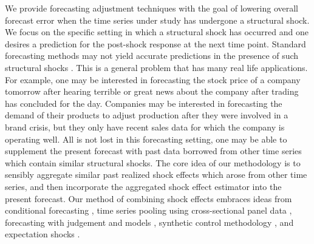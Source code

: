 \documentclass[11pt,3p,review,authoryear]{elsarticle}
\theoremstyle{definition}
\begin{document}
We provide forecasting adjustment techniques with the goal of lowering overall forecast error when the time series under study has undergone a structural shock. We focus on the specific setting in which a structural shock has occurred and one desires a prediction for the post-shock response at the next time point. Standard forecasting methods may not yield accurate predictions in the presence of such structural shocks \citep{baumeister2014real}. This is a general problem that has many real life applications. For example, one may be interested in forecasting the stock price of a company tomorrow after hearing terrible or great news about the company after trading has concluded for the day. Companies may be interested in forecasting the demand of their products to adjust production after they were involved in a brand crisis, but they only have recent sales data for which the company is operating well. All is not lost in this forecasting setting, one may be able to supplement the present forecast with past data borrowed from other time series which contain similar structural shocks. The core idea of our methodology is to sensibly aggregate similar past realized shock effects which arose from other time series, and then incorporate the aggregated shock effect estimator into the present forecast. Our method of combining shock effects embraces ideas from conditional forecasting \citep{baumeister2014real, kilian2017structural}, time series pooling using cross-sectional panel data \citep{ramaswamy1993empirical, pesaran1999pooled, hoogstrate2000pooling, baltagi2008forecasting, koop2012forecasting, liu2020forecasting}, forecasting with judgement and models \citep{svensson2005monetary, monti2008forecast}, synthetic control methodology \citep{abadie2010synthetic, agarwal2020two}, and expectation shocks \citep{croushore2006data, baumeister2014general, clements2019measuring}. 
\end{document}
